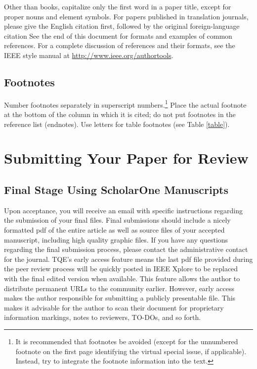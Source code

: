 \documentclass{ieeeaccess}
\begin{document}
Other than books, capitalize only the first word in a paper title, except
for proper nouns and element symbols. For papers published in translation
journals, please give the English citation first, followed by the original
foreign-language citation See the end of this document for formats and
examples of common references. For a complete discussion of references and
their formats, see the IEEE style manual at
\underline{http://www.ieee.org/authortools}.

\subsection{Footnotes}
Number footnotes separately in superscript numbers.\footnote{It is recommended that footnotes
    be avoided (except for
    the unnumbered footnote on the first page identifying the virtual special issue, if applicable). Instead,
    try to integrate the footnote information into the text.} Place the actual
footnote at the bottom of the column in which it is cited; do not put
footnotes in the reference list (endnotes). Use letters for table footnotes
(see Table \ref{table}).

\section{Submitting Your Paper for Review}

\subsection{Final Stage Using ScholarOne Manuscripts}
Upon acceptance, you will receive an email with specific instructions regarding the
submission of your final files. Final submissions should include a nicely formatted
pdf of the entire article as well as source files of your accepted manuscript, including
high quality graphic files. If you have any questions regarding the final submission
process, please contact the administrative contact for the journal.
TQE's early access feature means the last pdf file provided during the peer review
process will be quickly posted in IEEE Xplore to be replaced with the final edited
version when available. This feature allows the author to distribute permanent URLs
to the community earlier. However, early access makes the author responsible for
submitting a publicly presentable file. This makes it advisable for the author to
scan their document for proprietary information markings, notes to reviewers, TO-DOs,
and so forth.
\end{document}
